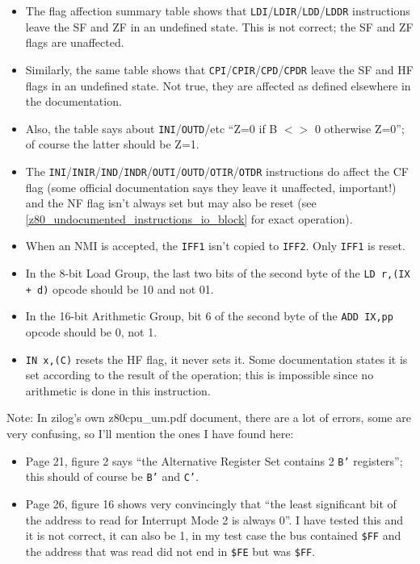 \begin{itemize}

	\item
	The flag affection summary table shows that {\tt LDI}/{\tt LDIR}/{\tt LDD}/{\tt LDDR} instructions leave the SF and ZF in an undefined state. This is not correct; the SF and ZF flags are unaffected.

	\item
	Similarly, the same table shows that {\tt CPI}/{\tt CPIR}/{\tt CPD}/{\tt CPDR} leave the SF and HF flags in an undefined state. Not true, they are affected as defined elsewhere in the documentation.

	\item
	Also, the table says about {\tt INI}/{\tt OUTD}/etc ``Z=0 if B $<>$ 0 otherwise Z=0''; of course the latter should be Z=1.

	\item
	The {\tt INI}/{\tt INIR}/{\tt IND}/{\tt INDR}/{\tt OUTI}/{\tt OUTD}/{\tt OTIR}/{\tt OTDR} instructions do affect the CF flag (some official documentation says they leave it unaffected, important!) and the NF flag isn't always set but may also be reset (see \ref{z80_undocumented_instructions_io_block} for exact operation).

	\item
	When an NMI is accepted, the {\tt IFF1} isn't copied to {\tt IFF2}. Only {\tt IFF1} is reset.

	\item
	In the 8-bit Load Group, the last two bits of the second byte of the {\tt LD r,(IX + d)} opcode should be 10 and not 01.

	\item
	In the 16-bit Arithmetic Group, bit 6 of the second byte of the {\tt ADD IX,pp} opcode should be 0, not 1.

	\item
	{\tt IN x,(C)} resets the HF flag, it never sets it. Some documentation states it is set according to the result of the operation; this is impossible since no arithmetic is done in this instruction.

\end{itemize}

Note: In zilog's own z80cpu\_um.pdf document, there are a lot of errors, some are very confusing, so I'll mention the ones I have found here:

\begin{itemize}

	\item
	Page 21, figure 2 says ``the Alternative Register Set contains 2 {\tt B'} registers''; this should of course be {\tt B'} and {\tt C'}.

	\item
	Page 26, figure 16 shows very convincingly that ``the least significant bit of the address to read for Interrupt Mode 2 is always 0''. I have tested this and it is not correct, it can also be 1, in my test case the bus contained {\tt \$FF} and the address that was read did not end in {\tt \$FE} but was {\tt \$FF}.
  
\end{itemize}
